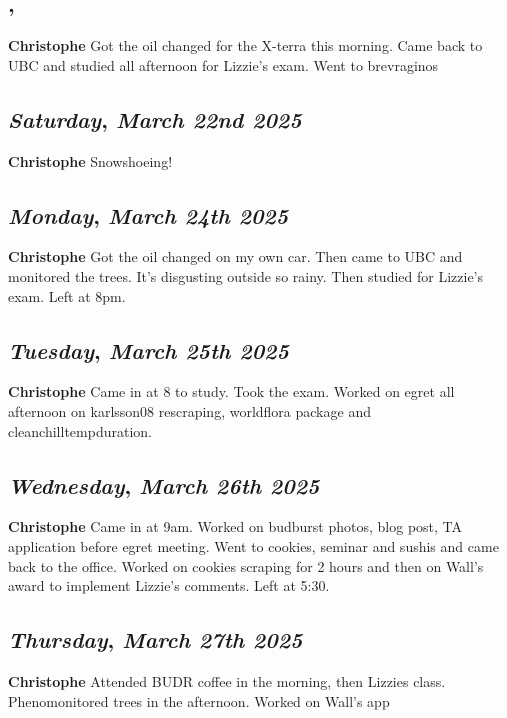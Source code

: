 \subsection*{\weekday, \day}
\textbf {Christophe}
Got the oil changed for the X-terra this morning. Came back to UBC and studied all afternoon for Lizzie's exam. Went to brevraginos

\def\day{\textit{March 22nd 2025}}
\def\weekday{\textit{Saturday}}
\subsection*{\weekday, \day}
\textbf {Christophe}
Snowshoeing!

\def\day{\textit{March 24th 2025}}
\def\weekday{\textit{Monday}}
\subsection*{\weekday, \day}
\textbf {Christophe}
Got the oil changed on my own car. Then came to UBC and monitored the trees. It's disgusting outside so rainy.  Then studied for Lizzie's exam. Left at 8pm.

\def\day{\textit{March 25th 2025}}
\def\weekday{\textit{Tuesday}}
\subsection*{\weekday, \day}
\textbf {Christophe}
Came in at 8 to study. Took the exam. Worked on egret all afternoon on karlsson08 rescraping, worldflora package and cleanchilltempduration. 

\def\day{\textit{March 26th 2025}}
\def\weekday{\textit{Wednesday}}
\subsection*{\weekday, \day}
\textbf {Christophe}
Came in at 9am. Worked on budburst photos, blog post, TA application before egret meeting. Went to cookies, seminar and sushis and came back to the office. Worked on cookies scraping for 2 hours and then on Wall's award to implement Lizzie's comments. Left at 5:30.

\def\day{\textit{March 27th 2025}}
\def\weekday{\textit{Thursday}}
\subsection*{\weekday, \day}
\textbf {Christophe}
Attended BUDR coffee in the morning, then Lizzies class. Phenomonitored trees in the afternoon.
Worked on Wall's app
\def\day{\textit{March 28th 2025}}
\def\weekday{\textit{Friday}}
